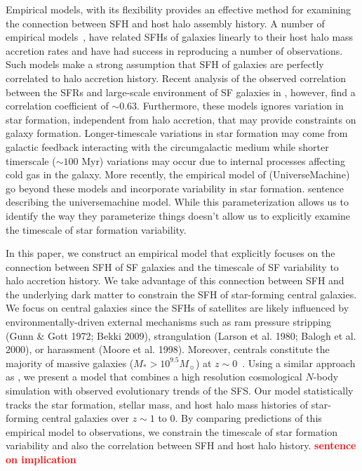 \documentclass[12pt, letterpaper, preprint, tighten]{aastex62}
\newcommand{\todo}[1]{{\bf \textcolor{red}{#1}}}
\newcommand{\ch}[1]{\color{orange}{\bf CH:} #1}
\begin{document}
Empirical models, with its flexibility provides an effective method for
examining the connection between SFH and host halo assembly history. A 
number of empirical models~\citep{taghizadeh-popp2015, becker2015, rodriguez-puebla2016a, mitra2017, cohn2017, moster2017}, 
have related SFHs of galaxies linearly to their host halo mass accretion 
rates and have had success in reproducing a number of observations. Such 
models make a strong assumption that SFH of galaxies are perfectly
correlated to halo accretion history. Recent analysis of the observed 
correlation between the SFRs and large-scale environment of SF galaxies 
in \cite{tinker2018b}, however, find a correlation coefficient of 
$\sim 0.63$. Furthermore, these models ignores variation in star formation, 
independent from halo accretion, that may provide constraints on galaxy 
formation. Longer-timescale variations in star formation may come from 
galactic feedback interacting with the circumgalactic medium while
shorter timerscale ($\sim 100$ Myr) variations may occur due to internal 
processes affecting cold gas in the galaxy. More recently, the empirical 
model of \cite{behroozi2018} ({\sc UniverseMachine}) go beyond these models
and incorporate variability in star formation. {\ch sentence describing 
the universemachine model.} While this parameterization allows us to identify 
the way they parameterize things doesn't allow us to explicitly examine
the timescale of star formation variability. 

{\ch In this paper, we construct an empirical model that explicitly focuses
on the connection between SFH of SF galaxies and the timescale of SF variability
to halo accretion history.} We take advantage of this connection between SFH and 
the underlying dark matter to constrain the SFH of star-forming central 
galaxies. We focus on central galaxies since the SFHs of satellites 
are likely influenced by environmentally-driven external mechanisms 
such as ram pressure stripping (Gunn \& Gott 1972; Bekki 2009), 
strangulation (Larson et al. 1980; Balogh et al. 2000), or 
harassment (Moore et al. 1998). Moreover, centrals constitute the 
majority of massive galaxies ($M_*>10^{9.5}M_\sun$) at 
$z\sim0$~\citep{wetzel2013}. Using a similar approach as \cite{wetzel2013, hahn2017}, 
we present a model that combines a high resolution cosmological 
$N$-body simulation with observed evolutionary trends of the SFS. 
Our model statistically tracks the star formation, stellar mass, 
and host halo mass histories of star-forming central galaxies over 
$z\sim1$ to $0$. By comparing predictions of this empirical 
model to observations, we constrain the timescale of star formation 
variability and also the correlation between SFH and host halo history.  
\todo{sentence on implication}
\end{document}
